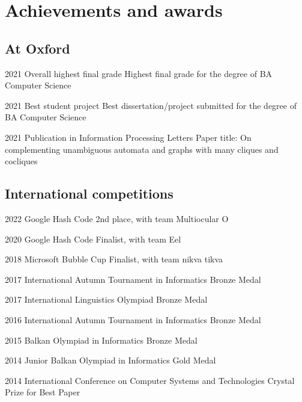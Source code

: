 \documentclass{tccv}
\begin{document}

\section{Achievements and awards}

\subsection{At Oxford}

\begin{yearlist}

\item{2021}
     {Overall highest final grade}
     {Highest final grade for the degree of BA Computer Science}

\item{2021}
     {Best student project}
     {Best dissertation/project submitted for the degree of BA Computer Science}

\item{2021}
     {Publication in Information Processing Letters}
     {Paper title: On complementing unambiguous automata
     and graphs with many cliques and cocliques}

\end{yearlist}

\subsection{International competitions}

\begin{yearlist}

\item{2022}
     {Google Hash Code}
     {2nd place, with team Multiocular O}

\item{2020}
     {Google Hash Code}
     {Finalist, with team Eel}

\item{2018}
     {Microsoft Bubble Cup}
     {Finalist, with team nikva tikva}

\item{2017}
     {International Autumn Tournament in Informatics}
     {Bronze Medal}

\item{2017}
     {International Linguistics Olympiad}
     {Bronze Medal}

\item{2016}
     {International Autumn Tournament in Informatics}
     {Bronze Medal}

\item{2015}
     {Balkan Olympiad in Informatics}
     {Bronze Medal}

\item{2014}
     {Junior Balkan Olympiad in Informatics}
     {Gold Medal}

\item{2014}
     {International Conference on Computer Systems and Technologies}
     {Crystal Prize for Best Paper}

\end{yearlist}
\end{document}
